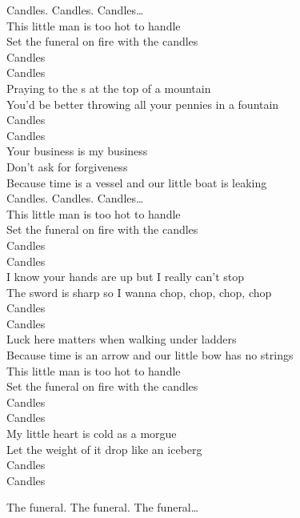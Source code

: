 


Candles. Candles. Candles…\\

This little man is too hot to handle\\
Set the funeral on fire with the candles\\
Candles\\
Candles\\
Praying to the s at the top of a mountain\\
You'd be better throwing all your pennies in a fountain\\
Candles\\
Candles\\

Your business is my business\\
Don't ask for forgiveness\\
Because time is a vessel and our little boat is leaking\\

Candles. Candles. Candles…\\

This little man is too hot to handle\\
Set the funeral on fire with the candles\\
Candles\\
Candles\\
I know your hands are up but I really can't stop\\
The sword is sharp so I wanna chop, chop, chop, chop\\
Candles\\
Candles\\

Luck here matters when walking under ladders\\
Because time is an arrow and our little bow has no strings\\

This little man is too hot to handle\\
Set the funeral on fire with the candles\\
Candles\\
Candles\\
My little heart is cold as a morgue\\
Let the weight of it drop like an iceberg\\
Candles\\
Candles\\




The funeral. The funeral. The funeral…\\
